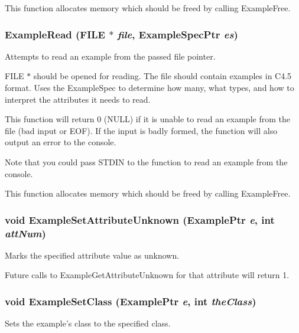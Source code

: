 This function allocates memory which should be freed by calling Example\-Free. 
\subsubsection{ Example\-Read (FILE $\ast$ {\em file}, {\bf Example\-Spec\-Ptr} {\em es})}\label{Example_8h_a18}


Attempts to read an example from the passed file pointer. 

FILE $\ast$ should be opened for reading. The file should contain examples in C4.5 format. Uses the Example\-Spec to determine how many, what types, and how to interpret the attributes it needs to read.

This function will return 0 (NULL) if it is unable to read an example from the file (bad input or EOF). If the input is badly formed, the function will also output an error to the console.

Note that you could pass STDIN to the function to read an example from the console.

This function allocates memory which should be freed by calling Example\-Free. 
\subsubsection{\setlength{\rightskip}{0pt plus 5cm}void Example\-Set\-Attribute\-Unknown ({\bf Example\-Ptr} {\em e}, int {\em att\-Num})}\label{Example_8h_a12}


Marks the specified attribute value as unknown. 

Future calls to Example\-Get\-Attribute\-Unknown for that attribute will return 1. 
\subsubsection{\setlength{\rightskip}{0pt plus 5cm}void Example\-Set\-Class ({\bf Example\-Ptr} {\em e}, int {\em the\-Class})}\label{Example_8h_a15}


Sets the example's class to the specified class. 

